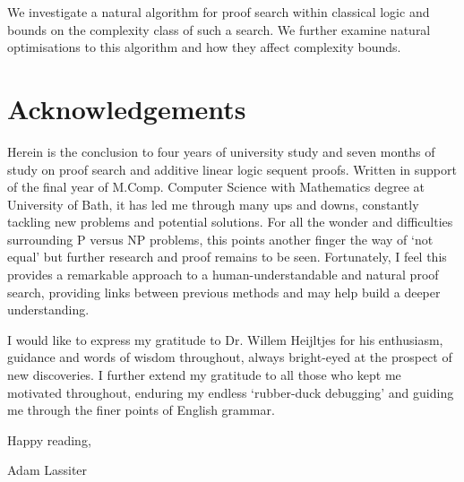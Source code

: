 \abstract
    We investigate a natural algorithm for proof search within classical logic and bounds on the complexity class of such a search.
    We further examine natural optimisations to this algorithm and how they affect complexity bounds.
\newpage

\section*{Acknowledgements}
    Herein is the conclusion to four years of university study and seven months of study on proof search and additive linear logic sequent proofs.
    Written in support of the final year of M.Comp. Computer Science with Mathematics degree at University of Bath, it has led me through many ups and downs, constantly tackling new problems and potential solutions.
    For all the wonder and difficulties surrounding P versus NP problems, this points another finger the way of `not equal' but further research and proof remains to be seen.
    Fortunately, I feel this provides a remarkable approach to a human-understandable and natural proof search, providing links between previous methods and may help build a deeper understanding.

    I would like to express my gratitude to Dr. Willem Heijltjes for his enthusiasm, guidance and words of wisdom throughout, always bright-eyed at the prospect of new discoveries.
    I further extend my gratitude to all those who kept me motivated throughout, enduring my endless `rubber-duck debugging' and guiding me through the finer points of English grammar.

    Happy reading,\par
    Adam Lassiter
\newpage


\tableofcontents
\newpage




